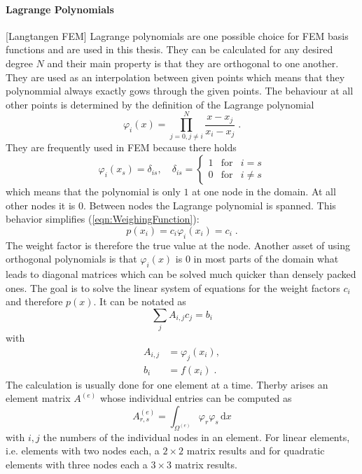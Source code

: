 \documentclass[%
  a4paper,oneside,%
  11pt,%
  smallchapters,
  green,%
  rgb, <cmyk>
  ,]{tubsbook}
\begin{document}
\paragraph{Lagrange Polynomials}
[Langtangen FEM]
Lagrange polynomials are one possible choice for FEM basis functions and are used in this thesis. They can be calculated for any desired degree $N$ and their main property is that they are orthogonal to one another. They are used as an interpolation between given points which means that they polynommial always exactly gows through the given points. The behaviour at all other points is determined by the definition of the Lagrange polynomial
\begin{equation}
\varphi_i(x) = \prod_{j=0,j\neq i}^N \frac{x-x_j}{x_i-x_j} \;.
\end{equation}
They are frequently used in FEM because there holds 
\begin{equation}
\varphi_i(x_s) = \delta_{is}, \quad \delta_{is}  =     \left\{ \begin{array}{rcl} 1 & \mbox{for}& i = s  \\ 0 & \mbox{for} & i \neq s\end{array}\right .
\end{equation}
which means that the polynomial is only $1$ at one node in the domain. At all other nodes it is $0$. Between nodes the Lagrange polynomial is spanned. This behavior simplifies (\ref{eqn:WeighingFunction}):
\begin{equation}
p(x_i) = c_i \varphi_i(x_i) = c_i \;.
\end{equation}
The weight factor is therefore the true value at the node.
Another asset of using orthogonal polynomials is that $\varphi_i(x)$ is $0$ in most parts of the domain what leads to diagonal matrices which can be solved much quicker than densely packed ones.
%
The goal is to solve the linear system of equations for the weight factors $c_i$ and therefore $p(x)$. It can be notated as
\begin{equation}
\sum_j A_{i,j} c_j = b_i
\end{equation}
with
\begin{align}
A_{i,j} &= \varphi_j(x_i), \\
b_i &= f(x_i) \;.
\end{align}
The calculation is usually done for one element at a time. Therby arises an element matrix $A^{(e)}$ whose individual entries can be computed as
\begin{equation}
A_{r,s}^{(e)} = \int_{\Omega^{(e)}} \varphi_r \varphi_s \, \mathrm{d}x 
\end{equation}
with $i,j$ the numbers of the individual nodes in an element. For linear elements, i.e. elements with two nodes each, a $2\times 2$ matrix results and for quadratic elements with three nodes each a $3\times3$ matrix results.
\end{document}
